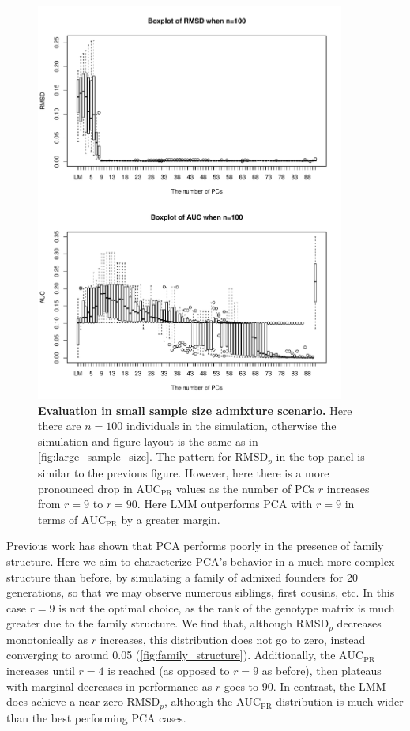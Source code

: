 \documentclass[11pt]{article}
\newcommand{\rmsd}{\text{RMSD}_p}
\newcommand{\auc}{\text{AUC}_\text{PR}}
\begin{document}
\begin{figure}[bp!]
  \centering
  \includegraphics[width=4in]{PCA_n_100_m_10_k_10.pdf}
  \caption{
    {\bf Evaluation in small sample size admixture scenario.}
    Here there are $n = 100$ individuals in the simulation, otherwise the simulation and figure layout is the same as in \cref{fig:large_sample_size}.
    The pattern for $\rmsd$ in the top panel is similar to the previous figure.
    However, here there is a more pronounced drop in $\auc$ values as the number of PCs $r$ increases from $r=9$ to $r=90$.
    Here LMM outperforms PCA with $r=9$ in terms of $\auc$ by a greater margin.
  }
  \label{fig:small_sample_size}
\end{figure}


Previous work has shown that PCA performs poorly in the presence of family structure.
Here we aim to characterize PCA's behavior in a much more complex structure than before, by simulating a family of admixed founders for 20 generations, so that we may observe numerous siblings, first cousins, etc.
In this case $r = 9$ is not the optimal choice, as the rank of the genotype matrix is much greater due to the family structure.
We find that, although $\rmsd$ decreases monotonically as $r$ increases, this distribution does not go to zero, instead converging to around 0.05 (\cref{fig:family_structure}).
Additionally, the $\auc$ increases until $r = 4$ is reached (as opposed to $r = 9$ as before), then plateaus with marginal decreases in performance as $r$ goes to 90.
In contrast, the LMM does achieve a near-zero $\rmsd$, although the $\auc$ distribution is much wider than the best performing PCA cases.
\end{document}

